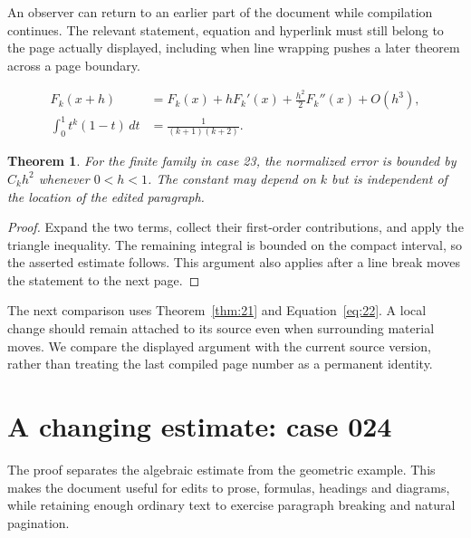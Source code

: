 \documentclass[a4paper,10pt]{article}
\newtheorem{theorem}{Theorem}[section]
\begin{document}
An observer can return to an earlier part of the document while compilation continues. The relevant statement, equation and hyperlink must still belong to the page actually displayed, including when line wrapping pushes a later theorem across a page boundary.

\lipsum[7-8]
\begin{align}\label{eq:22}
 F_k(x+h)&=F_k(x)+hF_k'(x)+\frac{h^2}{2}F_k''(x)+O(h^3),\\
 \int_0^1 t^k(1-t)\,dt&=\frac{1}{(k+1)(k+2)}.
\end{align}
\begin{theorem}\label{thm:22}
For the finite family in case 23, the normalized error is bounded by $C_k h^2$ whenever $0<h<1$. The constant may depend on $k$ but is independent of the location of the edited paragraph.
\end{theorem}
\begin{proof}
Expand the two terms, collect their first-order contributions, and apply the
triangle inequality. The remaining integral is bounded on the compact interval,
so the asserted estimate follows. This argument also applies after a line break
moves the statement to the next page.
\end{proof}
The next comparison uses Theorem~\ref{thm:21} and Equation~\ref{eq:22}. A local change should remain attached to its source even when surrounding material moves. We compare the displayed argument with the current source version, rather than treating the last compiled page number as a permanent identity.

\lipsum[13]

\section{A changing estimate: case 024}\label{unit:23}
The proof separates the algebraic estimate from the geometric example. This makes the document useful for edits to prose, formulas, headings and diagrams, while retaining enough ordinary text to exercise paragraph breaking and natural pagination.
\end{document}

